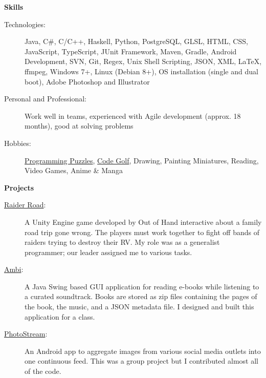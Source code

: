 \documentclass[letterpaper,11pt]{article}
\newcommand{\resheading}[1]{{\large \colorbox{mygrey}{\begin{minipage}{\textwidth}{\textbf{#1 \vphantom{p\^{E}}}}\end{minipage}}}}
\newcommand{\smallsect}[1]{{\footnotesize #1}}
\begin{document}
\resheading{Skills}
\begin{description}
	\item[Technologies:] \smallsect{
		Java, C\#, C/C++, Haskell, Python, PostgreSQL, GLSL, HTML, CSS, JavaScript, TypeScript, JUnit Framework, Maven, Gradle, Android Development, SVN, Git, Regex, Unix Shell Scripting, JSON, XML, \LaTeX, ffmpeg, Windows 7+, Linux (Debian 8+), OS installation (single and dual boot), Adobe Photoshop and Illustrator
	}
	\item[Personal and Professional:] \smallsect{
		Work well in teams, experienced with Agile development (approx. 18 months), good at solving problems
	}
	\item[Hobbies:] \smallsect{
		\href{https://projecteuler.net/profile/colossus16.png}{Programming Puzzles}, \href{https://codegolf.stackexchange.com/}{Code Golf}, Drawing, Painting Miniatures, Reading, Video Games, Anime \& Manga
	}
\end{description}

\resheading{Projects}
\begin{description}
	\item[\href{https://outofhandinteractive.wordpress.com/raider-road/}{Raider Road}:] \smallsect{
		A Unity Engine game developed by Out of Hand interactive about a family road trip gone wrong. The players must work together to fight off bands of raiders trying to destroy their RV. My role was as a generalist programmer; our leader assigned me to various tasks.
	}
	\item[\href{https://github.com/t-highfill/Ambi}{Ambi}:] \smallsect{
		A Java Swing based GUI application for reading e-books while listening to a curated soundtrack. Books are stored as zip files containing the pages of the book, the music, and a JSON metadata file. I designed and built this application for a class.
	}
	\item[\href{https://github.com/Team-Sigma/PhotoStream}{PhotoStream}:] \smallsect{
		An Android app to aggregate images from various social media outlets into one continuous feed. This was a group project but I contributed almost all of the code.
	}
\end{description}
\end{document}
